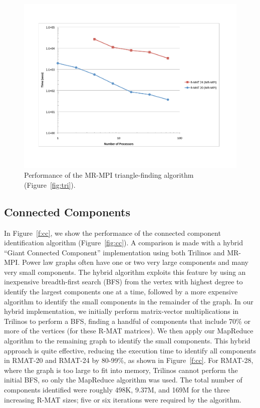 
\begin{figure}[htb]
\includegraphics[width=\textwidth]{fig_tri.pdf}
\caption{Performance of the MR-MPI triangle-finding algorithm
(Figure~\ref{fig:tri}).}
\label{f:tri}
\end{figure}

\subsection{Connected Components}

In Figure~\ref{f:cc}, we show the performance of the connected
component identification algorithm (Figure~\ref{fig:cc}).  A
comparison is made with a hybrid ``Giant Connected Component''
implementation using both Trilinos and MR-MPI.  Power law graphs often
have one or two very large components and many very small components.
The hybrid algorithm exploits this feature by using an inexpensive
breadth-first search (BFS) from the vertex with highest degree to
identify the largest components one at a time, followed by a more
expensive algorithm to identify the small components in the remainder
of the graph.  In our hybrid implementation, we initially perform
matrix-vector multiplications in Trilinos to perform a BFS, finding a
handful of components that include 70\% or more of the vertices (for
these R-MAT matrices).  We then apply our MapReduce algorithm to the
remaining graph to identify the small components.  This hybrid
approach is quite effective, reducing the execution time to identify
all components in RMAT-20 and RMAT-24 by 80-99\%, as shown in
Figure~\ref{f:cc}.  For RMAT-28, where the graph is too large to fit
into memory, Trilinos cannot perform the initial BFS, so only the
MapReduce algorithm was used.  The total number of components
identified were roughly 498K, 9.37M, and 169M for the three increasing
R-MAT sizes; five or six iterations were required by the algorithm.

